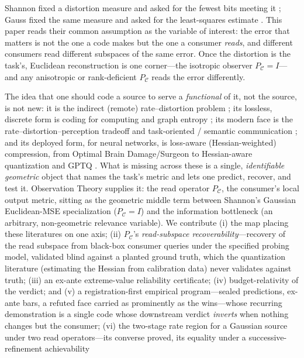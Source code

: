 \documentclass[11pt]{article}
\theoremstyle{definition}
\theoremstyle{remark}
\newcommand{\PC}{P_{\mathcal{C}}}
\begin{document}
Shannon fixed a distortion measure and asked for the fewest bits meeting it
\cite{shannon1948,shannon1959}; Gauss fixed the same measure and asked for the
least-squares estimate \cite{gauss1809}. This paper reads their common assumption
as the variable of interest: the error that matters is not the one a code makes but
the one a consumer \emph{reads}, and different consumers read different subspaces of
the same error. Once the distortion is the task's, Euclidean reconstruction is one
corner---the isotropic observer $\PC=I$---and any anisotropic or rank-deficient $\PC$
reads the error differently.

The idea that one should code a source to serve a \emph{functional} of it, not the
source, is not new: it is the indirect (remote) rate--distortion problem
\cite{dobrushin1962,wolfziv1970,witsenhausen1980}; its lossless, discrete form is
coding for computing and graph entropy \cite{korner1973,orlitsky2001}; its modern
face is the rate--distortion--perception tradeoff \cite{blau2019} and task-oriented
/ semantic communication \cite{gunduz2023}; and its deployed form, for neural
networks, is loss-aware (Hessian-weighted) compression, from Optimal Brain
Damage/Surgeon \cite{lecun1990,hassibi1993} to Hessian-aware quantization and GPTQ
\cite{dong2019hawq,frantar2023gptq}. What is missing across these is a single,
\emph{identifiable geometric} object that names the task's metric and lets one
predict, recover, and test it. Observation Theory supplies it: the read operator
$\PC$, the consumer's local output metric, sitting as the geometric middle term
between Shannon's Gaussian Euclidean-MSE specialization ($\PC=I$) and the information
bottleneck \cite{tishby1999} (an arbitrary, non-geometric relevance variable). We
contribute (i) the map placing these literatures on one axis; (ii) $\PC$'s
\emph{read-subspace recoverability}---recovery of the read subspace from black-box
consumer queries under the specified probing model, validated blind against a
planted ground truth, which the quantization literature (estimating the Hessian from
calibration data) never validates against truth; (iii) an ex-ante extreme-value
reliability certificate; (iv) budget-relativity of the verdict; and (v) a
registration-first empirical program---sealed predictions, ex-ante bars, a refuted
face carried as prominently as the wins---whose recurring demonstration is a single
code whose downstream verdict \emph{inverts} when nothing changes but the consumer;
(vi) the two-stage rate region for a Gaussian source under two read
operators---its converse proved, its equality under a successive-refinement achievability
\end{document}
